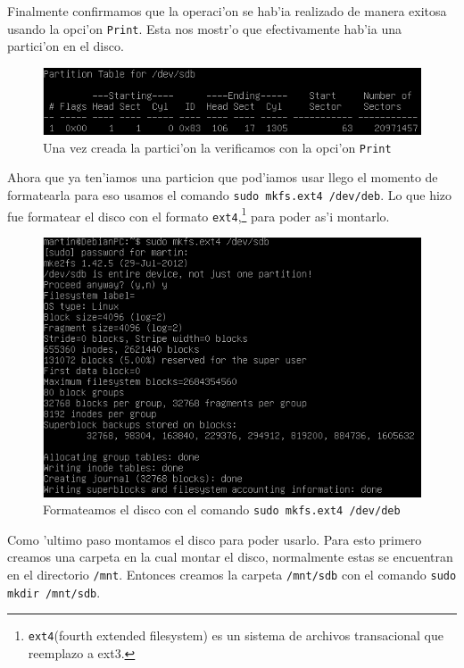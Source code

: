 \documentclass[11pt]{article}
\begin{document}
		Finalmente confirmamos que la operaci'on se hab'ia realizado de manera exitosa usando la opci'on \texttt{Print}. Esta nos mostr'o que efectivamente hab'ia una partici'on en el disco.

		\begin{figure}[H]
    			\centering
    			\includegraphics[scale=0.65]{Images/rsync/rsync_disk_table.PNG}
    			\caption{Una vez creada la partici'on la verificamos con la opci'on \texttt{Print}}
    			\label{fig:rsync_disk_table}
		\end{figure}

		Ahora que ya ten'iamos una particion que pod'iamos usar llego el momento de formatearla para eso usamos el comando \texttt{sudo mkfs.ext4 /dev/deb}. Lo que hizo fue formatear el disco con el formato \texttt{ext4},\footnote{\texttt{ext4}(fourth extended filesystem) es un sistema de archivos transacional que reemplazo a ext3.} para poder as'i montarlo.
		
 		\begin{figure}[H]
    			\centering
    			\includegraphics[scale=0.65]{Images/rsync/rsync_disk_format.PNG}
    			\caption{Formateamos el disco con el comando \texttt{sudo mkfs.ext4 /dev/deb}}
    			\label{fig:rsync_disk_format}
		\end{figure}

		Como 'ultimo paso montamos el disco para poder usarlo. Para esto primero creamos una carpeta en la cual montar el disco, normalmente estas se encuentran en el directorio \texttt{/mnt}. Entonces creamos la carpeta \texttt{/mnt/sdb} con el comando \texttt{sudo mkdir /mnt/sdb}.
\end{document}
